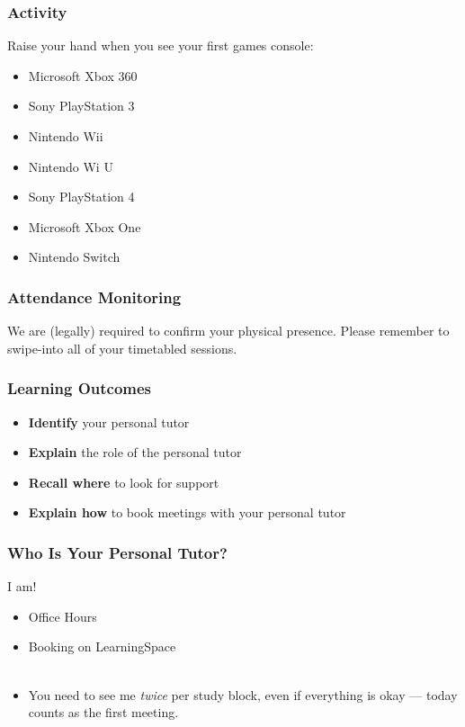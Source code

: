 \begin{frame}
	\frametitle{Activity}
	
	Raise your hand when you see your first games console:
	
	\begin{itemize}
		\item Microsoft Xbox 360 
		\item Sony PlayStation 3  \pause
		\item Nintendo Wii  \pause
		\item Nintendo Wi U  \pause
		\item Sony PlayStation 4 \pause
		\item Microsoft Xbox One \pause
		\item Nintendo Switch \pause
	\end{itemize}
\end{frame}

\begin{frame}
	\frametitle{Attendance Monitoring}
	
	We are (legally) required to confirm your physical presence. Please remember to swipe-into all of your timetabled sessions.
	
\end{frame}

\begin{frame}
	\frametitle{Learning Outcomes}
	\begin{itemize}
		\item \textbf{Identify} your personal tutor
		\item \textbf{Explain} the role of the personal tutor
		\item \textbf{Recall where} to look for support
		\item \textbf{Explain how} to book meetings with your personal tutor
	\end{itemize}
\end{frame}

\begin{frame}
	\frametitle{Who Is Your Personal Tutor?}

	I am!

	\begin{itemize}
		\item Office Hours
		\item Booking on LearningSpace
		\\~\\
		\item You need to see me \textit{twice} per study block, even if everything is okay --- today counts as the first meeting.
	\end{itemize}
\end{frame}

